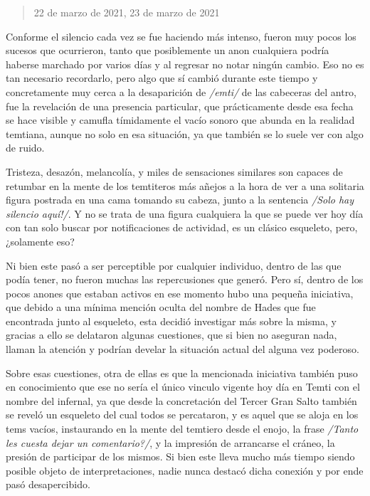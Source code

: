 \documentclass[
]{book}
\begin{document}
\begin{quote}
22 de marzo de 2021, 23 de marzo de 2021
\end{quote}

Conforme el silencio cada vez se fue haciendo más intenso, fueron muy pocos los sucesos que ocurrieron, tanto que posiblemente un anon cualquiera podría haberse marchado por varios días y al regresar no notar ningún cambio. Eso no es tan necesario recordarlo, pero algo que sí cambió durante este tiempo y concretamente muy cerca a la desaparición de \emph{/emti/} de las cabeceras del antro, fue la revelación de una presencia particular, que prácticamente desde esa fecha se hace visible y camufla tímidamente el vacío sonoro que abunda en la realidad temtiana, aunque no solo en esa situación, ya que también se lo suele ver con algo de ruido.

Tristeza, desazón, melancolía, y miles de sensaciones similares son capaces de retumbar en la mente de los temtiteros más añejos a la hora de ver a una solitaria figura postrada en una cama tomando su cabeza, junto a la sentencia \emph{/Solo hay silencio aquí!/}. Y no se trata de una figura cualquiera la que se puede ver hoy día con tan solo buscar por notificaciones de actividad, es un clásico esqueleto, pero, ¿solamente eso?

Ni bien este pasó a ser perceptible por cualquier individuo, dentro de las que podía tener, no fueron muchas las repercusiones que generó. Pero sí, dentro de los pocos anones que estaban activos en ese momento hubo una pequeña iniciativa, que debido a una mínima mención oculta del nombre de Hades que fue encontrada junto al esqueleto, esta decidió investigar más sobre la misma, y gracias a ello se delataron algunas cuestiones, que si bien no aseguran nada, llaman la atención y podrían develar la situación actual del alguna vez poderoso.

Sobre esas cuestiones, otra de ellas es que la mencionada iniciativa también puso en conocimiento que ese no sería el único vinculo vigente hoy día en Temti con el nombre del infernal, ya que desde la concretación del Tercer Gran Salto también se reveló un esqueleto del cual todos se percataron, y es aquel que se aloja en los tems vacíos, instaurando en la mente del temtiero desde el enojo, la frase \emph{/Tanto les cuesta dejar un comentario?/}, y la impresión de arrancarse el cráneo, la presión de participar de los mismos. Si bien este lleva mucho más tiempo siendo posible objeto de interpretaciones, nadie nunca destacó dicha conexión y por ende pasó desapercibido.
\end{document}
